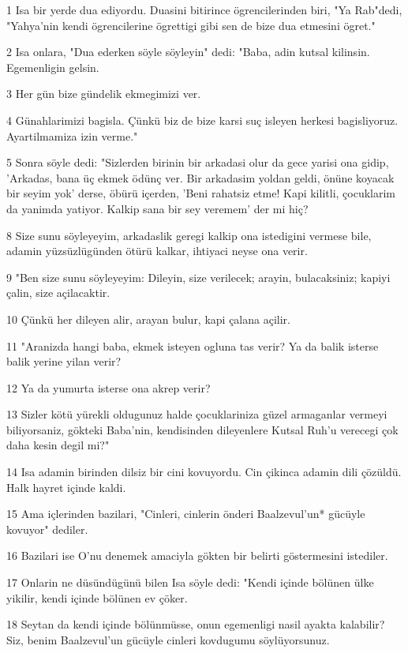 \par 1 Isa bir yerde dua ediyordu. Duasini bitirince ögrencilerinden biri, "Ya Rab"dedi, "Yahya'nin kendi ögrencilerine ögrettigi gibi sen de bize dua etmesini ögret."
\par 2 Isa onlara, "Dua ederken söyle söyleyin" dedi: "Baba, adin kutsal kilinsin. Egemenligin gelsin.
\par 3 Her gün bize gündelik ekmegimizi ver.
\par 4 Günahlarimizi bagisla. Çünkü biz de bize karsi suç isleyen herkesi bagisliyoruz. Ayartilmamiza izin verme."
\par 5 Sonra söyle dedi: "Sizlerden birinin bir arkadasi olur da gece yarisi ona gidip, 'Arkadas, bana üç ekmek ödünç ver. Bir arkadasim yoldan geldi, önüne koyacak bir seyim yok' derse, öbürü içerden, 'Beni rahatsiz etme! Kapi kilitli, çocuklarim da yanimda yatiyor. Kalkip sana bir sey veremem' der mi hiç?
\par 8 Size sunu söyleyeyim, arkadaslik geregi kalkip ona istedigini vermese bile, adamin yüzsüzlügünden ötürü kalkar, ihtiyaci neyse ona verir.
\par 9 "Ben size sunu söyleyeyim: Dileyin, size verilecek; arayin, bulacaksiniz; kapiyi çalin, size açilacaktir.
\par 10 Çünkü her dileyen alir, arayan bulur, kapi çalana açilir.
\par 11 "Aranizda hangi baba, ekmek isteyen ogluna tas verir? Ya da balik isterse balik yerine yilan verir?
\par 12 Ya da yumurta isterse ona akrep verir?
\par 13 Sizler kötü yürekli oldugunuz halde çocuklariniza güzel armaganlar vermeyi biliyorsaniz, gökteki Baba'nin, kendisinden dileyenlere Kutsal Ruh'u verecegi çok daha kesin degil mi?"
\par 14 Isa adamin birinden dilsiz bir cini kovuyordu. Cin çikinca adamin dili çözüldü. Halk hayret içinde kaldi.
\par 15 Ama içlerinden bazilari, "Cinleri, cinlerin önderi Baalzevul'un* gücüyle kovuyor" dediler.
\par 16 Bazilari ise O'nu denemek amaciyla gökten bir belirti göstermesini istediler.
\par 17 Onlarin ne düsündügünü bilen Isa söyle dedi: "Kendi içinde bölünen ülke yikilir, kendi içinde bölünen ev çöker.
\par 18 Seytan da kendi içinde bölünmüsse, onun egemenligi nasil ayakta kalabilir? Siz, benim Baalzevul'un gücüyle cinleri kovdugumu söylüyorsunuz.

